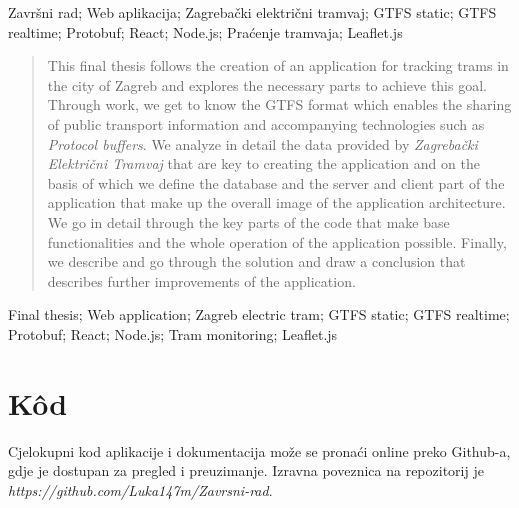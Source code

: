 \documentclass[zavrsnirad]{fer}
\begin{document}
\begin{kljucnerijeci}
  Završni rad; Web aplikacija; Zagrebački električni tramvaj; GTFS static; GTFS realtime; Protobuf; React; Node.js; Praćenje tramvaja; Leaflet.js
\end{kljucnerijeci}


\begin{abstract}
	This final thesis follows the creation of an application for tracking trams in the city of Zagreb and explores the necessary parts to achieve this goal. Through work, we get to know the GTFS format which enables the sharing of public transport information and accompanying technologies such as \textit{Protocol buffers}. We analyze in detail the data provided by \textit{Zagrebački Električni Tramvaj} that are key to creating the application and on the basis of which we define the database and the server and client part of the application that make up the overall image of the application architecture. We go in detail through the key parts of the code that make base functionalities and the whole operation of the application possible. Finally, we describe and go through the solution and draw a conclusion that describes further improvements of the application.
\end{abstract}

\begin{keywords}
  Final thesis; Web application; Zagreb electric tram; GTFS static; GTFS realtime; Protobuf; React; Node.js; Tram monitoring; Leaflet.js
\end{keywords}



\backmatter

\chapter{K\^od}
Cjelokupni kod aplikacije i dokumentacija može se pronaći online preko Github-a, gdje je dostupan za pregled i preuzimanje. Izravna poveznica na repozitorij je\\ \textit{https://github.com/Luka147m/Zavrsni-rad}.
\end{document}
